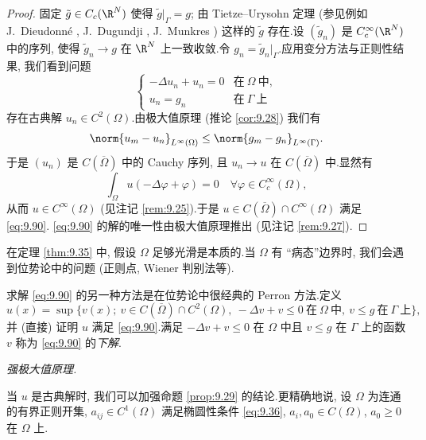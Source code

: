 \begin{proof}
固定 $\tilde g\in C_c(\R^N)$ 使得 $\tilde g|_\Gamma=g$; 由
Tietze--Urysohn 定理 (参见例如 J.~Dieudonn\'e ,
J.~Dugundji , J.~Munkres )
这样的 $\tilde g$ 存在.设 $(\tilde g_n)$ 是 $C_c^\infty(\R^N)$ 中的序列,
使得 $\tilde g_n\to g$ 在 $\R^N$ 上一致收敛.令
$g_n=\tilde g_n|_\Gamma$.应用变分方法与正则性结果, 我们看到问题
\begin{equation*}
\begin{cases}
-\Delta u_n+u_n=0 & \text{在}\ \Omega\ \text{中},\\
u_n=g_n & \text{在}\ \Gamma\ \text{上}
\end{cases}
\end{equation*}
存在古典解 $u_n\in C^2(\Omega)$.由极大值原理 (推论  \ref{cor:9.28}) 我们有
\begin{equation*}
\norm{u_m-u_n}_{L^\infty(\Omega)}\le\norm{g_m-g_n}_{L^\infty(\Gamma)}.
\end{equation*}
于是 $(u_n)$ 是 $C(\overline\Omega)$ 中的 Cauchy 序列, 且
$u_n\to u$ 在 $C(\overline\Omega)$ 中.显然有
\begin{equation*}
\int_\Omega u(-\Delta\varphi+\varphi)=0\quad\forall\varphi\in C_c^\infty(\Omega),
\end{equation*}
从而 $u\in C^\infty(\Omega)$ (见注记 \ref{rem:9.25}).于是
$u\in C(\overline\Omega)\cap C^\infty(\Omega)$ 满足 \eqref{eq:9.90}.
\eqref{eq:9.90} 的解的唯一性由极大值原理推出 (见注记 \ref{rem:9.27}).
\end{proof}

\begin{starremark}
\label{rem:9.31}
在定理  \ref{thm:9.35} 中, 假设 $\Omega$ 足够光滑是本质的.当 $\Omega$ 有
``病态''边界时, 我们会遇到位势论中的问题 (正则点, Wiener 判别法等).

求解 \eqref{eq:9.90} 的另一种方法是在位势论中很经典的 Perron 方法.定义
\begin{equation*}
u(x)=\sup\{v(x);\ v\in C(\overline\Omega)\cap C^2(\Omega),\
-\Delta v+v\le0\ \text{在}\ \Omega\ \text{中},\ v\le g\ \text{在}\
\Gamma\ \text{上}\},
\end{equation*}
并 (直接) 证明 $u$ 满足 \eqref{eq:9.90}.满足
$-\Delta v+v\le0$ 在 $\Omega$ 中且 $v\le g$ 在 $\Gamma$ 上的函数 $v$
称为 \eqref{eq:9.90} 的\emph{下解}.
\end{starremark}

 \emph{强极大值原理.}

当 $u$ 是古典解时, 我们可以加强命题  \ref{prop:9.29} 的结论.更精确地说,
设 $\Omega$ 为连通的有界正则开集, $a_{ij}\in C^1(\Omega)$ 满足椭圆性条件
\eqref{eq:9.36}, $a_i,a_0\in C(\Omega)$, $a_0\ge0$ 在 $\Omega$ 上.

